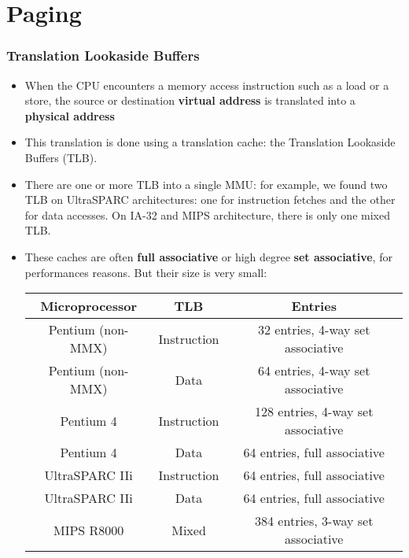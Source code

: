 %
%

\section{Paging}


\begin{frame}
  \frametitle{Translation Lookaside Buffers}

  \begin{itemize}
    \item
    When the CPU encounters a memory access instruction such as
    a load or a store, the source or destination \textbf{virtual
    address} is translated into a \textbf{physical address}
    \item
    This translation is done using a translation cache: the
    Translation Lookaside Buffers (TLB).
    \item
    There are one or more TLB into a single MMU: for example, we
    found two TLB on UltraSPARC architectures: one for instruction
    fetches and the other for data accesses. On IA-32 and MIPS
    architecture, there is only one mixed TLB.
    \item
    These caches are often \textbf{full associative} or high degree
    \textbf{set associative}, for performances reasons. But their size
    is very small:
    \begin{tabular}{|c|c|c|}
    \hline
    Microprocessor & TLB & Entries \\
    \hline
    Pentium (non-MMX) & Instruction & 32 entries, 4-way set associative \\
    \hline
    Pentium (non-MMX) & Data & 64 entries, 4-way set associative \\
    \hline
    Pentium 4 & Instruction & 128 entries, 4-way set associative \\
    \hline
    Pentium 4 & Data & 64 entries, full associative \\
    \hline
    UltraSPARC IIi & Instruction & 64 entries, full associative \\
    \hline
    UltraSPARC IIi & Data & 64 entries, full associative \\
    \hline
    MIPS R8000 & Mixed & 384 entries, 3-way set associative \\
    \hline
    \end{tabular}
  \end{itemize}
\end{frame}


